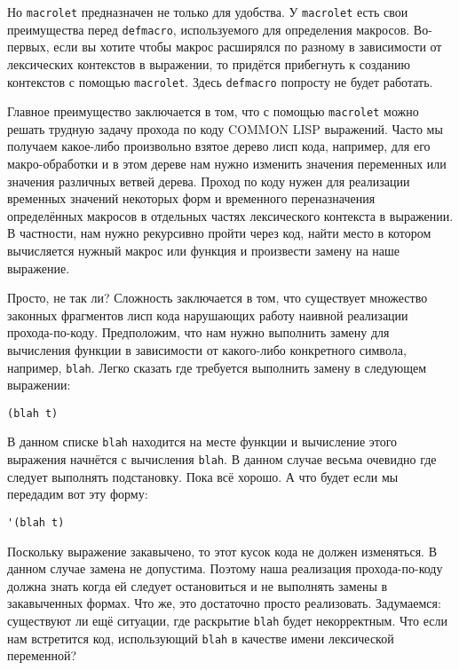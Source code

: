 Но \verb"macrolet" предназначен не только для удобства. У \verb"macrolet" есть свои преимущества перед \verb"defmacro", используемого для определения макросов. Во-первых, если вы хотите чтобы макрос расширялся по разному в зависимости от лексических контекстов в выражении, то придётся прибегнуть к созданию контекстов с помощью \verb"macrolet". Здесь \verb"defmacro" попросту не будет работать.

Главное преимущество заключается в том, что с помощью \verb"macrolet" можно решать трудную задачу прохода по коду COMMON LISP выражений. Часто мы получаем какое-либо произвольно взятое дерево лисп кода, например, для его макро-обработки и в этом дереве нам нужно изменить значения переменных или значения различных ветвей дерева. Проход по коду нужен для реализации временных значений некоторых форм и временного переназначения определённых макросов в отдельных частях лексического контекста в выражении. В частности, нам нужно рекурсивно пройти через код, найти место в котором вычисляется нужный макрос или функция и произвести замену на наше выражение.

Просто, не так ли? Сложность заключается в том, что существует множество законных фрагментов лисп кода нарушающих работу наивной реализации прохода-по-коду. Предположим, что нам нужно выполнить замену для вычисления функции в зависимости от какого-либо конкретного символа, например, \verb"blah". Легко сказать где требуется выполнить замену в следующем выражении:

\begin{verbatim}
(blah t)
\end{verbatim}

В данном списке \verb"blah" находится на месте функции и вычисление этого выражения начнётся с вычисления \verb"blah". В данном случае весьма очевидно где следует выполнять подстановку. Пока всё хорошо. А что будет если мы передадим вот эту форму:

\begin{verbatim}
'(blah t)
\end{verbatim}

Поскольку выражение закавычено, то этот кусок кода не должен изменяться. В данном случае замена не допустима. Поэтому наша реализация прохода-по-коду должна знать когда ей следует остановиться и не выполнять замены в закавыченных формах. Что же, это достаточно просто реализовать. Задумаемся: существуют ли ещё ситуации, где раскрытие \verb"blah" будет некорректным. Что если нам встретится код, использующий \verb"blah" в качестве имени лексической переменной?

